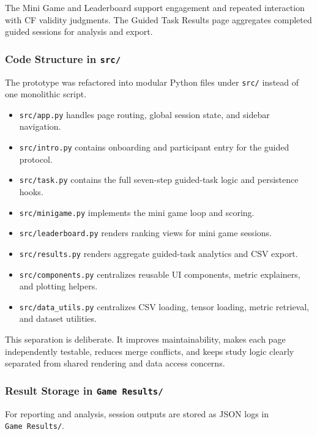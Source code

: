 \documentclass[
  letterpaper,
  DIV=11,
  numbers=noendperiod]{scrartcl}
\providecommand{\tightlist}{%
  \setlength{\itemsep}{0pt}\setlength{\parskip}{0pt}}\usepackage{longtable,booktabs,array}
\begin{document}
The Mini Game and Leaderboard support engagement and repeated
interaction with CF validity judgments. The Guided Task Results page
aggregates completed guided sessions for analysis and export.

\subsubsection{\texorpdfstring{Code Structure in
\texttt{src/}}{Code Structure in src/}}\label{code-structure-in-src}

The prototype was refactored into modular Python files under
\texttt{src/} instead of one monolithic script.

\begin{itemize}
\tightlist
\item
  \texttt{src/app.py} handles page routing, global session state, and
  sidebar navigation.
\item
  \texttt{src/intro.py} contains onboarding and participant entry for
  the guided protocol.
\item
  \texttt{src/task.py} contains the full seven-step guided-task logic
  and persistence hooks.
\item
  \texttt{src/minigame.py} implements the mini game loop and scoring.
\item
  \texttt{src/leaderboard.py} renders ranking views for mini game
  sessions.
\item
  \texttt{src/results.py} renders aggregate guided-task analytics and
  CSV export.
\item
  \texttt{src/components.py} centralizes reusable UI components, metric
  explainers, and plotting helpers.
\item
  \texttt{src/data\_utils.py} centralizes CSV loading, tensor loading,
  metric retrieval, and dataset utilities.
\end{itemize}

This separation is deliberate. It improves maintainability, makes each
page independently testable, reduces merge conflicts, and keeps study
logic clearly separated from shared rendering and data access concerns.

\subsubsection{\texorpdfstring{Result Storage in
\texttt{Game\ Results/}}{Result Storage in Game Results/}}\label{result-storage-in-game-results}

For reporting and analysis, session outputs are stored as JSON logs in
\texttt{Game\ Results/}.
\end{document}
